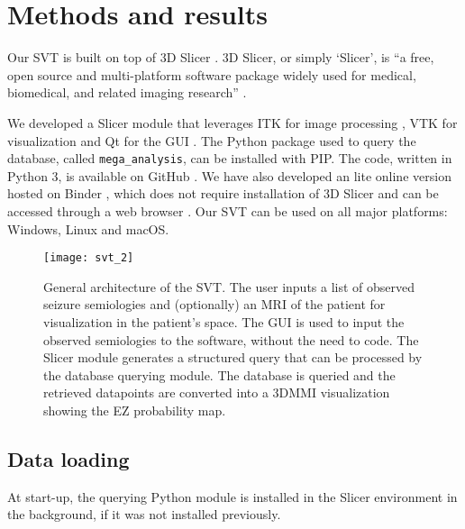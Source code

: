 \section{Methods and results}

Our \ac{SVT} is built on top of 3D Slicer \cite{fedorov_3d_2012}.
3D Slicer, or simply `Slicer', is ``a free, open source and multi-platform software package widely used for medical, biomedical, and related imaging research''%
.

We developed a Slicer module that leverages \ac{ITK} for image processing \cite{mccormick_itk_2014}, \ac{VTK} for visualization \cite{schroeder_visualization_2006} and Qt for the \ac{GUI}%
.
The Python package used to query the \svtdatabase database, called \texttt{mega\_analysis}, can be installed with \ac{PIP}.
The code, written in Python 3, is available on GitHub%
\fnurl{\svtgithub}.
We have also developed an lite online version hosted on Binder \cite{bussonnier_binder_2018}, which does not require installation of 3D Slicer and can be accessed through a web browser%
.
Our \ac{SVT} can be used on all major platforms: Windows, Linux and macOS.

\begin{figure}
  \centering
  \texttt{[image: svt\_2]}
  \caption[General architecture of the Semiology Visualization Tool]{
    General architecture of the \ac{SVT}.
    The user inputs a list of observed seizure semiologies and (optionally) an \ac{MRI} of the patient for visualization in the patient's space.
    The \ac{GUI} is used to input the observed semiologies to the software, without the need to code.
    The Slicer module generates a structured query that can be processed by the \svtdatabase database querying module.
    The database is queried and the retrieved datapoints are converted into a \ac{3DMMI} visualization showing the \ac{EZ} probability map.
  }
  \label{fig:svt_architecture}
\end{figure}


\subsection{Data loading}

At start-up, the querying Python module is installed in the Slicer environment in the background, if it was not installed previously.

